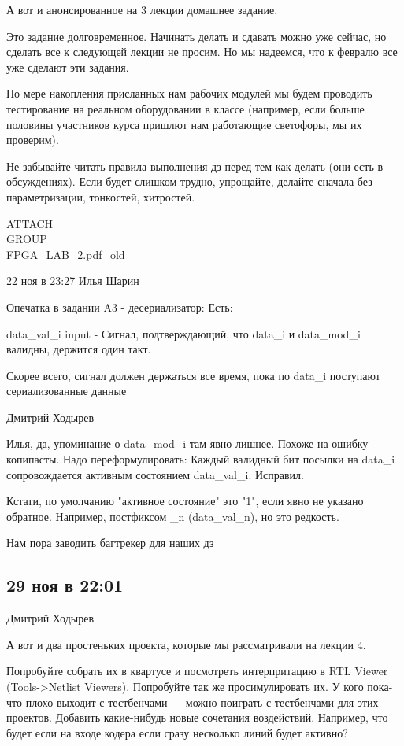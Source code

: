 \documentclass[a4paper, 12pt]{extarticle}
\begin{document}

А вот и анонсированное на 3 лекции домашнее задание.

Это задание долговременное. Начинать делать и сдавать можно уже сейчас, но сделать все к следующей лекции не просим. Но мы надеемся, что к февралю все уже сделают эти задания.

По мере накопления присланных нам рабочих модулей мы будем проводить тестирование на реальном оборудовании в классе (например, если больше половины участников курса пришлют нам работающие светофоры, мы их проверим).

Не забывайте читать правила выполнения дз перед тем как делать (они есть в обсуждениях). Если будет слишком трудно, упрощайте, делайте сначала без параметризации, тонкостей, хитростей.

ATTACH\\GROUP\\FPGA_LAB_2.pdf_old

22 ноя в 23:27
Илья Шарин

Опечатка в задании A3 - десериализатор:
Есть:

data_val_i input - Сигнал, подтверждающий, что data_i и
data_mod_i валидны, держится один такт.

Скорее всего, сигнал должен держаться все время, пока по data_i поступают сериализованные данные

Дмитрий Ходырев

Илья, да, упоминание о data_mod_i там явно лишнее. Похоже на ошибку копипасты. Надо переформулировать: Каждый валидный бит посылки на data_i сопровождается активным состоянием data_val_i. Исправил.

Кстати, по умолчанию "активное состояние" это "1", если явно не указано обратное. Например, постфиксом _n (data_val_n), но это редкость.

Нам пора заводить багтрекер для наших дз

\subsection{29 ноя в 22:01}

Дмитрий Ходырев

А вот и два простеньких проекта, которые мы рассматривали на лекции 4.

Попробуйте собрать их в квартусе и посмотреть интерпритацию в RTL Viewer (Tools->Netlist Viewers). Попробуйте так же просимулировать их. У кого пока-что плохо выходит с тестбенчами — можно поиграть с тестбенчами для этих проектов. Добавить какие-нибудь новые сочетания воздействий. Например, что будет если на входе кодера если сразу несколько линий будет активно?
\end{document}
